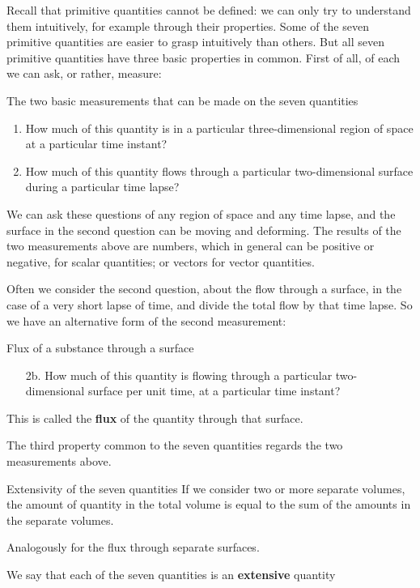 \documentclass[a4paper,12pt,%
onecolumn,oneside,titlepage,%
british%
]{memoir}
\newcommand{\mynotew}[1]{{\footnotesize\color{midgrey}\faIcon{tools}\ #1}}
\renewcommand*{\|}[1][]{\nonscript\:#1\vert\nonscript\:\mathopen{}}
\begin{document}
\medskip

Recall that primitive quantities cannot be defined: we can only try to understand them intuitively, for example through their properties. Some of the seven primitive quantities are easier to grasp intuitively than others. But all seven primitive quantities have three basic properties in common. First of all, of each we can ask, or rather, measure:
\begin{definition}{The two basic measurements that can be made on the seven quantities}
  \begin{enumerate}[shift,label=\arabic*.]\bfseries
  \item How much of this quantity is in a particular three-dimensional region of space at a particular time instant?
  \item How much of this quantity flows through a particular two-dimensional surface during a particular time lapse?
  \end{enumerate}
\end{definition}
We can ask these questions of any region of space and any time lapse, and the surface in the second question can be moving and deforming.
The results of the two measurements above are numbers, which in general can be positive or negative, for scalar quantities; or vectors for vector quantities.

Often we consider the second question, about the flow through a surface, in the case of a very short lapse of time, and divide the total flow by that time lapse. So we have an alternative form of the second measurement:
\begin{definition}{Flux of a substance through a surface}
  \begin{enumerate}[shift,label=\arabic*.]\bfseries
  \item[2b.] How much of this quantity is flowing through a particular two-dimensional surface per unit time, at a particular time instant?
  \end{enumerate}
\end{definition}
This is called the \textbf{flux} of the quantity through that surface.

The third  property common to the seven quantities regards the two measurements above.
\begin{definition}{Extensivity of the seven quantities}
  If we consider two or more separate volumes, the amount of quantity in the total volume is equal to the sum of the amounts in the separate volumes.

  Analogously for the flux through separate surfaces.
\end{definition}
We say that each of the seven quantities is an \textbf{extensive} quantity
\end{document}
